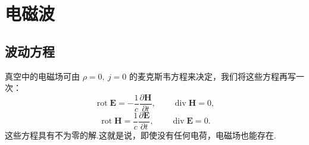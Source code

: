 \chapter{电磁波}

\section{波动方程}

真空中的电磁场可由 $\rho = 0,\ j = 0$ 的麦克斯韦方程来决定，我们将这些方程再写一次：
\begin{equation}
  \operatorname{rot}\boldsymbol{E}=-\frac{1}{c}\frac{\partial\boldsymbol{H}}{\partial t},
  \qquad\operatorname{div}\boldsymbol{H}=0,
\end{equation}
\begin{equation}
  \operatorname{rot}\boldsymbol{H}=\frac{1}{c}\frac{\partial\boldsymbol{E}}{\partial t},
  \qquad\operatorname{div}\boldsymbol{E}=0.
\end{equation}
这些方程具有不为零的解.这就是说，即使没有任何电荷，电磁场也能存在.


